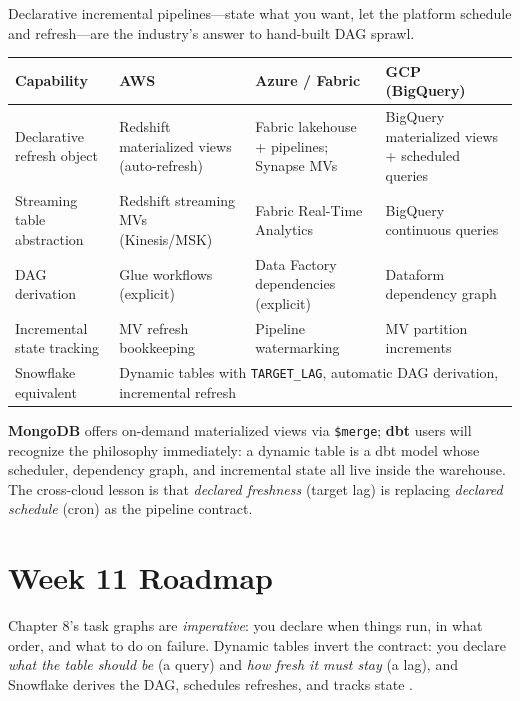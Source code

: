 \begin{crosscloud}
Declarative incremental pipelines---state what you want, let the platform schedule and refresh---are the industry's answer to hand-built DAG sprawl.

\vspace{2mm}
{\footnotesize
\begin{tabular}{@{}p{2.8cm}p{3.0cm}p{3.0cm}p{3.0cm}@{}}
\toprule
\textbf{Capability} & \textbf{AWS} & \textbf{Azure / Fabric} & \textbf{GCP (BigQuery)} \\
\midrule
Declarative refresh object & Redshift materialized views (auto-refresh) & Fabric lakehouse + pipelines; Synapse MVs & BigQuery materialized views + scheduled queries \\
Streaming table abstraction & Redshift streaming MVs (Kinesis/MSK) & Fabric Real-Time Analytics & BigQuery continuous queries \\
DAG derivation & Glue workflows (explicit) & Data Factory dependencies (explicit) & Dataform dependency graph \\
Incremental state tracking & MV refresh bookkeeping & Pipeline watermarking & MV partition increments \\
\addlinespace
Snowflake equivalent & \multicolumn{3}{l}{Dynamic tables with \texttt{TARGET\_LAG}, automatic DAG derivation, incremental refresh} \\
\bottomrule
\end{tabular}}

\vspace{1mm}
\textbf{MongoDB} offers on-demand materialized views via \texttt{\$merge}; \textbf{dbt} users will recognize the philosophy immediately: a dynamic table is a dbt model whose scheduler, dependency graph, and incremental state all live inside the warehouse. The cross-cloud lesson is that \emph{declared freshness} (target lag) is replacing \emph{declared schedule} (cron) as the pipeline contract.
\end{crosscloud}

\section{Week 11 Roadmap}
Chapter 8's task graphs are \emph{imperative}: you declare when things run, in what order, and what to do on failure. Dynamic tables invert the contract: you declare \emph{what the table should be} (a query) and \emph{how fresh it must stay} (a lag), and Snowflake derives the DAG, schedules refreshes, and tracks state \cite{snowflakeDynamicTablesDocs}.

